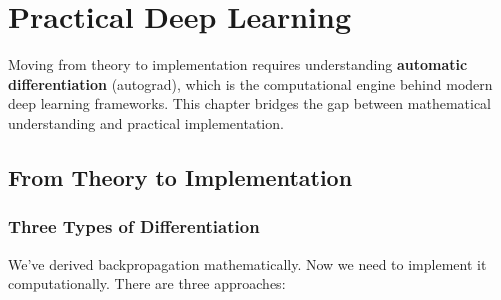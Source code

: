 
\chapter{Practical Deep Learning}
\label{ch:practical_dl}

\begin{keyconcept}
Moving from theory to implementation requires understanding \textbf{automatic differentiation} (autograd), which is the computational engine behind modern deep learning frameworks. This chapter bridges the gap between mathematical understanding and practical implementation.
\end{keyconcept}

\section{From Theory to Implementation}

\subsection{Three Types of Differentiation}

We've derived backpropagation mathematically. Now we need to implement it computationally. There are three approaches:

